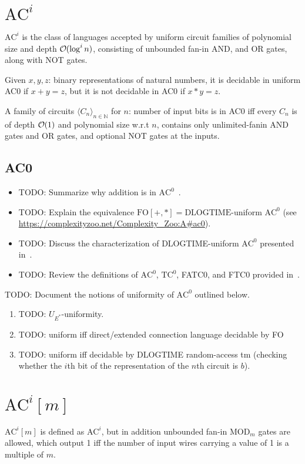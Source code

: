 \section{\texorpdfstring{$\text{AC}^i$}{AC\string^i}}
$\text{AC}^i$ is the class of languages accepted by uniform circuit
families of polynomial size and depth $\bigO(\log^i n)$, consisting of unbounded fan-in
AND, and OR gates, along with NOT gates.

Given $x, y, z$: binary representations of natural numbers,
it is decidable in uniform AC0 if $x + y = z$, but it is not decidable 
in AC0 if $x * y = z$.

A family of circuits $\langle C_n \rangle_{n \in \mathbb{N}}$ for $n$:
number of input bits is in AC0 iff every $C_n$ is of depth $\bigO(1)$ and polynomial 
size w.r.t $n$, contains only unlimited-fanin AND gates and OR gates, and optional 
NOT gates at the inputs. 

\subsection{AC0}
\begin{itemize}
\item TODO: Summarize why addition is in $\text{AC}^0$~\cite{BussLectureNotes}.
\item TODO: Explain the equivalence $\text{FO}[+, *] = \text{DLOGTIME}$-uniform $\text{AC}^0$ (see \url{https://complexityzoo.net/Complexity_Zoo:A#ac0}).
\item TODO: Discuss the characterization of DLOGTIME-uniform $\text{AC}^0$ presented in~\cite{hella2023regularrepresentationsuniformtc0}.
\item TODO: Review the definitions of $\text{AC}^0$, $\text{TC}^0$, FATC0, and FTC0 provided in~\cite{612309}.
\end{itemize}
TODO: Document the notions of uniformity of $\text{AC}^0$ outlined below.
\begin{enumerate}
\item TODO: $U_{E^*}$-uniformity.
\item TODO: uniform iff direct/extended connection language decidable by FO 
\item TODO: uniform iff decidable by DLOGTIME random-access tm (checking whether the $i$th bit of the representation of the $n$th circuit is $b$).
\end{enumerate}



\section{\texorpdfstring{$\text{AC}^i[m]$}{AC\string^i[m]}}
$\text{AC}^i[m]$ is defined as $\text{AC}^i$, but in addition unbounded fan-in $\text{MOD}_m$ gates
are allowed, which output 1 iff the number of input wires carrying a value of 1 is a
multiple of $m$.

